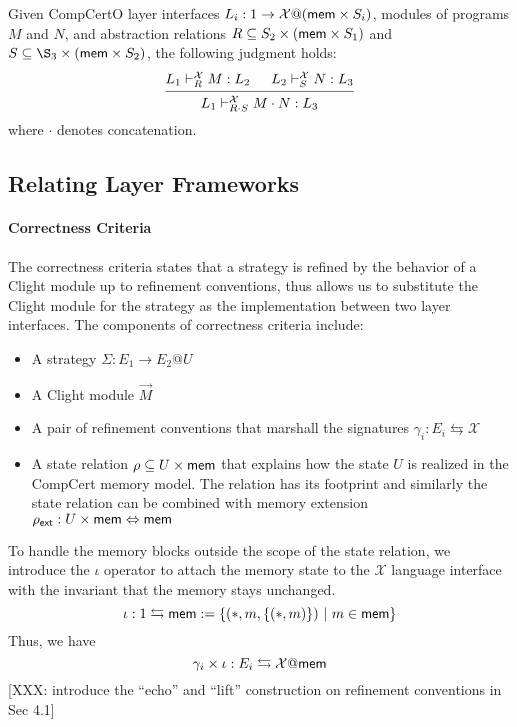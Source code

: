 \documentclass[sigplan,10pt,authordraft]{acmart}
\begin{document}
\begin{lemma}
  Given CompCertO layer interfaces
  $L_i : 1 \rightarrow \mathcal{X}@( \mathsf{mem} \times S_i)$, modules of programs
  $M$ and $N$, and abstraction relations
  $R\subseteq S_2 \times ( \mathsf{mem}  \times S_1)$ and
  $S\subseteq \S_3 \times (\kw{mem} \times S_2)$, the following judgment holds:
  \[
    \begin{prooftree}
      \hypo{L_1 \vdash^\mathcal{X}_R M : L_2}
      \hypo{L_2 \vdash^\mathcal{X}_S N : L_3}
      \infer2{L_1 \vdash^\mathcal{X}_{R\cdot S} M \cdot N : L_3}
    \end{prooftree}
  \]
  where $\cdot$ denotes concatenation.
\end{lemma}

\subsection{Relating Layer Frameworks}

\paragraph{Correctness Criteria} The correctness criteria states that a strategy
is refined by the behavior of a Clight module up to refinement conventions, thus
allows us to substitute the Clight module for the strategy as the implementation
between two layer interfaces. The components of correctness criteria include:

\begin{itemize}
\item A strategy $\Sigma: E_1 \rightarrow E_2 @ U$
\item A Clight module $\vec{M}$
\item A pair of refinement conventions that marshall the signatures
  $\gamma_i: E_i \leftrightarrows \mathcal{X}$
\item A state relation $\rho \subseteq U \times  \mathsf{mem} $ that explains how the
  state $U$ is realized in the CompCert memory model. The relation has its
  footprint and similarly the state relation can be combined with memory
  extension
  $\rho_{ \mathsf{ext} }: U \times  \mathsf{mem}  \Leftrightarrow  \mathsf{mem} $
\end{itemize}

To handle the memory blocks outside the scope of the state relation, we
introduce the $\iota$ operator to attach the memory state to the
$\mathcal{X}$ language interface with the invariant that the memory stays
unchanged.
\[
  \iota : 1 \leftrightarrows  \mathsf{mem}  := \{ (*, m, \{(*, m)\})\ |\ m \in  \mathsf{mem}  \}
\]
Thus, we have
\[
  \gamma_i \times \iota : E_i \leftrightarrows \mathcal{X}@ \mathsf{mem} 
\]
[XXX: introduce the ``echo'' and ``lift'' construction on refinement conventions in Sec 4.1]
\end{document}
